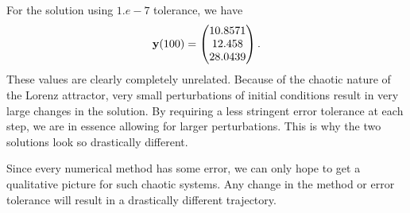\begin{solution}
\begin{enumerate}[(a)]
\[    \]
    For the solution using $1.e-7$ tolerance, we have
    \[
      \mathbf{y}(100) = 
      \begin{pmatrix}
        10.8571 \\
        12.458 \\
        28.0439
      \end{pmatrix}.
    \]
    These values are clearly completely unrelated. Because of the chaotic nature of the Lorenz attractor, very small perturbations of initial conditions result in very large changes in the solution. By requiring a less stringent error tolerance at each step, we are in essence allowing for larger perturbations. This is why the two solutions look so drastically different.
    
    Since every numerical method has some error, we can only hope to get a qualitative picture for such chaotic systems. Any change in the method or error tolerance will result in a drastically different trajectory.
  \end{enumerate}
\end{solution}